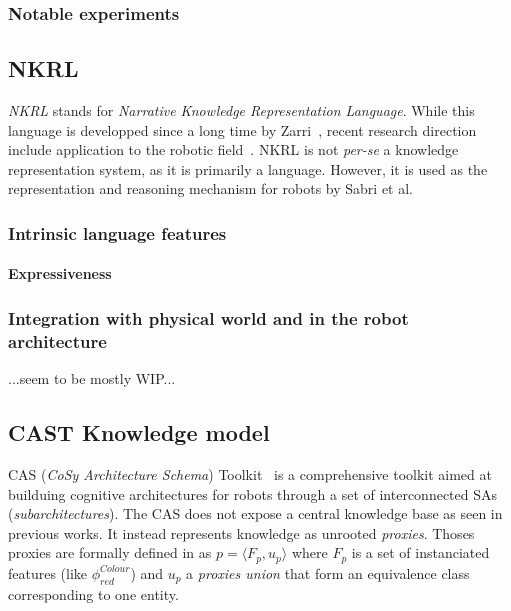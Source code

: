 \documentclass[a4paper, twocolumn]{article}
\begin{document}
\subsubsection{Notable experiments}
\label{sect|peis-expe}

\subsection{NKRL}
\label{sect|nkrl}

\emph{NKRL} stands for \emph{Narrative Knowledge Representation Language}.
While this language is developped since a long time by Zarri~\cite{Zarri1997,
Zarri2008}, recent research direction include application to the robotic
field~\cite{Sabri2011}. NKRL is not {\it per-se} a knowledge representation
system, as it is primarily a language. However, it is used as the
representation and reasoning mechanism for robots by Sabri et al.

\subsubsection{Intrinsic language features}
\label{sect|nkrl-intrinsic-features}

\paragraph{Expressiveness}

\subsubsection{Integration with physical world and in the robot architecture}
\label{sect|nkrl-integration}

...seem to be mostly WIP...


\subsection{CAST Knowledge model}
\label{sect|cast}

CAS (\emph{CoSy Architecture Schema}) Toolkit~\cite{Hawes2007} is a
comprehensive toolkit aimed at builduing cognitive architectures for robots
through a set of interconnected SAs (\emph{subarchitectures}). The CAS does not
expose a central knowledge base as seen in previous works. It instead
represents knowledge as unrooted \emph{proxies}. Thoses proxies are formally
defined in \cite{Jacobsson2008} as $p= \langle F_p, u_p \rangle$ where $F_p$ is
a set of instanciated features (like $\phi^{Colour}_{red}$) and $u_p$ a
\emph{proxies union} that form an equivalence class corresponding to one
entity.
\end{document}

